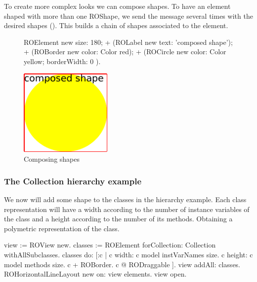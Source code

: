 \documentclass[a4paper,10pt,twoside]{book}
\begin{document}
To create more complex looks we can compose shapes. To have an element shaped with more than one ROShape, we send the \ct{+} message several times with the desired shapes (). This builds a chain of shapes associated to the element.

\begin{figure}[H]
      \begin{minipage}[t]{0.5\textwidth}
      \vspace{0pt}
     \begin{code}
     
ROElement new 
	size: 180;  
	+ (ROLabel new text: 'composed shape');
	+ (ROBorder new color: Color red); 
	+ (ROCircle new color: Color yellow; 
					borderWidth: 0 ).	\end{code}
   \end{minipage}
   \hfill
   \begin{minipage}[t]{0.4\textwidth}
      \vspace{0pt} \raggedright
       \centering
		\includegraphics[width=0.4\textwidth]{composed}
   \end{minipage}
\caption{Composing shapes}
\label{fig:composed}
\end{figure} 

\subsubsection*{The Collection hierarchy example}
We now will add some shape to the classes in the  hierarchy example. Each class representation will have a width according to the number of instance variables of the class and a height according to the number of its methods. Obtaining a polymetric representation of the class.

\begin{code}{}
view := ROView new.
classes := ROElement forCollection: Collection withAllSubclasses.
classes do: [:c | 
	c width: c model instVarNames size.
	c height: c model methods size.
	c + ROBorder. 
	c @ RODraggable ].
view addAll: classes.
ROHorizontalLineLayout new on: view elements.
view open.
\end{code}
\end{document}
